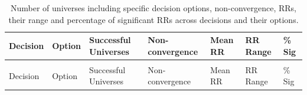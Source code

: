 \documentclass[
  man,
  floatsintext,
  longtable,
  nolmodern,
  notxfonts,
  notimes,
  colorlinks=true,linkcolor=blue,citecolor=blue,urlcolor=blue]{apa7}
\begin{document}
\begin{longtable}[t]{>{\raggedright\arraybackslash}p{2.5cm}>{\raggedright\arraybackslash}p{5cm}>{\raggedleft\arraybackslash}p{1.2cm}>{\raggedleft\arraybackslash}p{1.2cm}>{\raggedleft\arraybackslash}p{1.5cm}>{\centering\arraybackslash}p{2cm}>{\raggedleft\arraybackslash}p{1.2cm}}

\caption{\label{tbl-RRfulltable}Number of universes including specific
decision options, non-convergence, RRs, their range and percentage of
significant RRs across decisions and their options.}

\tabularnewline

\toprule
Decision & Option & Successful Universes & Non-convergence & Mean RR & RR Range & \% Sig\\
\midrule
\endfirsthead
\multicolumn{7}{@{}l}{\textit{(continued)}}\\
\toprule
Decision & Option & Successful Universes & Non-convergence & Mean RR & RR Range & \% Sig\\
\midrule
\endhead


\end{longtable}
\end{document}
